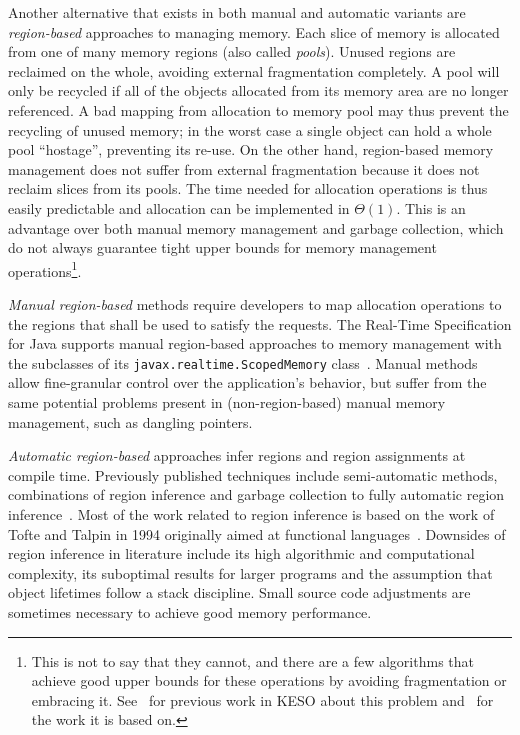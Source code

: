 		Another alternative that exists in both manual and automatic variants are \emph{region-based} approaches to managing
		memory. Each slice of memory is allocated from one of many memory regions (also called \emph{pools}). Unused regions
		are reclaimed on the whole, avoiding external fragmentation completely. A pool will only be recycled if all of the
		objects allocated from its memory area are no longer referenced. A bad mapping from allocation to memory pool may
		thus prevent the recycling of unused memory; in the worst case a single object can hold a whole pool
		\enquote{hostage}, preventing its re-use. On the other hand, region-based memory management does not suffer from
		external fragmentation because it does not reclaim slices from its pools. The time needed for allocation operations
		is thus easily predictable and allocation can be implemented in $\Theta(1)$. This is an advantage over both manual
		memory management and garbage collection, which do not always guarantee tight upper bounds for memory management
		operations\footnote{This is not to say that they cannot, and there are a few algorithms that achieve good upper
		bounds for these operations by avoiding fragmentation or embracing it. See~\cite{strotz:14} for previous work in
		KESO about this problem and~\cite{pizlo:10:pldi} for the work it is based on.}.

		\emph{Manual region-based} methods require developers to map allocation operations to the regions that shall be used
		to satisfy the requests. The Real-Time Specification for Java supports manual region-based approaches to memory
		management with the subclasses of its \texttt{javax.realtime.ScopedMemory} class~\cite{rtsj:06:scoped}. Manual
		methods allow fine-granular control over the application's behavior, but suffer from the same potential problems
		present in (non-region-based) manual memory management, such as dangling pointers.

		\emph{Automatic region-based} approaches infer regions and region assignments at compile time. Previously published
		techniques include semi-automatic methods, combinations of region inference and garbage collection to fully
		automatic region inference~\cite{grossman:02:pldi, hallenberg:02:sigplan, chin:04:pldi}. Most of the work related to
		region inference is based on the work of Tofte and Talpin in 1994 originally aimed at functional
		languages~\cite{tofte:94:popl}. Downsides of region inference in literature include its high algorithmic and
		computational complexity, its suboptimal results for larger programs and the assumption that object lifetimes follow
		a stack discipline. Small source code adjustments are sometimes necessary to achieve good memory
		performance.~\cite{henglein:01:ppdp}

